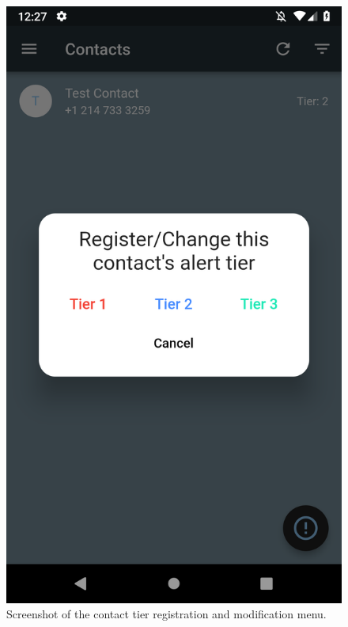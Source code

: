 \documentclass[10pt, a4paper]{article}
\begin{document}
\begin{figure}[H]
  \includegraphics[width=\linewidth]{final-diagrams/Emulator-Screenshots/Screenshot_1556126824.png}
  \caption{Screenshot of the contact tier registration and modification menu.}
\endminipage\hfill
{}%

\end{figure}
\end{document}
